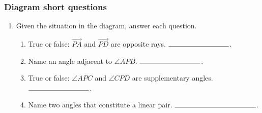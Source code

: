 \documentclass[12pt, oneside]{article}
\begin{document}
\subsubsection*{Diagram short questions}
  \begin{enumerate}
    \item Given the situation in the diagram, answer each question. \vspace{1cm}
      \begin{flushright}
      \end{flushright}
    \begin{enumerate}
      \item True or false: $\overrightarrow{PA}$ and $\overrightarrow{PD}$ are opposite rays. $\rule{3cm}{0.15mm}$. \bigskip
      \item Name an angle adjacent to $\angle APB$. $\rule{3cm}{0.15mm}$. \bigskip
      \item True or false: $\angle APC$ and $\angle CPD$ are supplementary angles. $\rule{3cm}{0.15mm}$. \bigskip
      \item Name two angles that constitute a linear pair. $\rule{4cm}{0.15mm}$. \bigskip
    \end{enumerate}


\end{enumerate}
\end{document}
